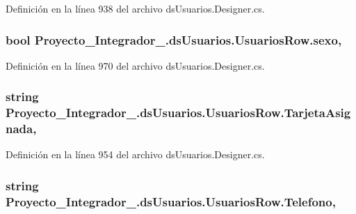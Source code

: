 Definición en la línea 938 del archivo ds\-Usuarios.\-Designer.\-cs.

\hypertarget{class_proyecto___integrador__3_1_1ds_usuarios_1_1_usuarios_row_a459ef01bf05692c7b43e376b3d6620b5}{
\subsubsection[{sexo}]{\setlength{\rightskip}{0pt plus 5cm}bool Proyecto\-\_\-\-Integrador\-\_.\-ds\-Usuarios.\-Usuarios\-Row.\-sexo\hspace{0.3cm}{\ttfamily [get]}, {\ttfamily [set]}}}\label{class_proyecto___integrador__3_1_1ds_usuarios_1_1_usuarios_row_a459ef01bf05692c7b43e376b3d6620b5}


Definición en la línea 970 del archivo ds\-Usuarios.\-Designer.\-cs.

\hypertarget{class_proyecto___integrador__3_1_1ds_usuarios_1_1_usuarios_row_aa22b95dee1aa553d36348fd272f7bf51}{
\subsubsection[{Tarjeta\-Asignada}]{\setlength{\rightskip}{0pt plus 5cm}string Proyecto\-\_\-\-Integrador\-\_.\-ds\-Usuarios.\-Usuarios\-Row.\-Tarjeta\-Asignada\hspace{0.3cm}{\ttfamily [get]}, {\ttfamily [set]}}}\label{class_proyecto___integrador__3_1_1ds_usuarios_1_1_usuarios_row_aa22b95dee1aa553d36348fd272f7bf51}


Definición en la línea 954 del archivo ds\-Usuarios.\-Designer.\-cs.

\hypertarget{class_proyecto___integrador__3_1_1ds_usuarios_1_1_usuarios_row_aed26f4593a25f2cbea2d3fb95c032d75}{
\subsubsection[{Telefono}]{\setlength{\rightskip}{0pt plus 5cm}string Proyecto\-\_\-\-Integrador\-\_.\-ds\-Usuarios.\-Usuarios\-Row.\-Telefono\hspace{0.3cm}{\ttfamily [get]}, {\ttfamily [set]}}}\label{class_proyecto___integrador__3_1_1ds_usuarios_1_1_usuarios_row_aed26f4593a25f2cbea2d3fb95c032d75}


